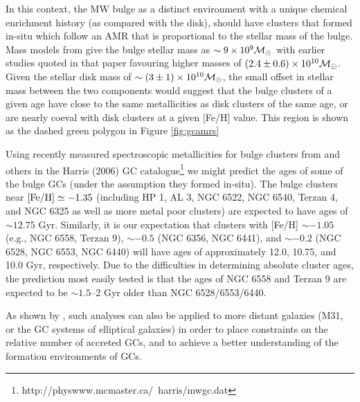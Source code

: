 \documentclass[useAMS,usenatbib]{mn2e}
\newcommand\msol{{{\cal M}_\odot}}
\begin{document}
In this context, the MW bulge as a distinct environment with a unique chemical
enrichment history (as compared with the disk), should have clusters that 
formed in-situ which follow an AMR that is proportional to the stellar mass of
the bulge.  Mass models from \cite{McMillan11} give the bulge stellar mass as
$\sim 9\times 10^{9} \msol$ with earlier studies quoted in that paper favouring 
higher masses of $(2.4 \pm 0.6) \times 10^{10} \msol$.
Given the stellar disk mass of $\sim  (3 \pm 1) \times 10^{10} \msol$, 
the small offset in stellar mass between the two
components would suggest that the bulge clusters of a given age have 
close to the same metallicities as disk clusters of the same age, or are nearly
coeval with disk clusters at a given [Fe/H] value.  This region is shown as the
dashed green polygon in Figure \ref{fig:gcamrs}

Using recently measured spectroscopic metallicities for bulge clusters from
\cite{Saviane12} and others in the Harris (2006) GC
catalogue\footnote{http://physwww.mcmaster.ca/~harris/mwgc.dat} we might
predict the ages of some of the bulge GCs (under the assumption they formed
in-situ).  The bulge clusters near $\rm{[Fe/H]} \simeq -1.35$
(including HP 1, AL 3, NGC 6522, NGC 6540, Terzan 4, and NGC 6325 as well as
more metal poor clusters) are expected to have ages of $\sim 12.75$ Gyr.
Similarly, it is our expectation that clusters with [Fe/H] $\sim -1.05$
(e.g., NGC 6558, Terzan 9), $\sim -0.5$ (NGC 6356, NGC 6441), and 
$\sim -0.2$ (NGC 6528, NGC 6553, NGC 6440) will have ages of approximately 
12.0, 10.75, and 10.0 Gyr, respectively.  Due to the
difficulties in determining absolute cluster ages, the prediction most easily
tested is that the ages of NGC 6558 and Terzan 9 are expected to be $\sim 1.5$--2
Gyr older than NGC 6528/6553/6440.

As shown by \cite{Cote98}, such analyses can also be applied to more distant
galaxies (M31, or the GC systems of elliptical galaxies) in order to place
constraints on the relative number of accreted GCs, and to achieve a better
understanding of the formation environments of GCs.  
\end{document}
